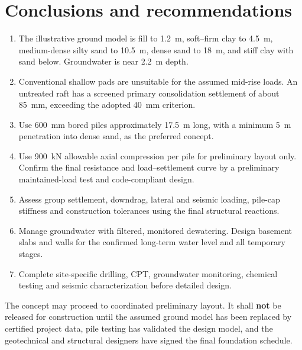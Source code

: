 \section{Conclusions and recommendations}
\begin{enumerate}
  \item The illustrative ground model is fill to \SI{1.2}{\metre}, soft--firm clay to
        \SI{4.5}{\metre}, medium-dense silty sand to \SI{10.5}{\metre}, dense sand to
        \SI{18}{\metre}, and stiff clay with sand below. Groundwater is near
        \SI{2.2}{\metre} depth.
  \item Conventional shallow pads are unsuitable for the assumed mid-rise loads. An untreated
        raft has a screened primary consolidation settlement of about \SI{85}{\milli\metre},
        exceeding the adopted \SI{40}{\milli\metre} criterion.
  \item Use \SI{600}{\milli\metre} bored piles approximately \SI{17.5}{\metre} long, with a
        minimum \SI{5}{\metre} penetration into dense sand, as the preferred concept.
  \item Use \SI{900}{\kilo\newton} allowable axial compression per pile for preliminary layout
        only. Confirm the final resistance and load--settlement curve by a preliminary
        maintained-load test and code-compliant design.
  \item Assess group settlement, downdrag, lateral and seismic loading, pile-cap stiffness and
        construction tolerances using the final structural reactions.
  \item Manage groundwater with filtered, monitored dewatering. Design basement slabs and walls
        for the confirmed long-term water level and all temporary stages.
  \item Complete site-specific drilling, CPT, groundwater monitoring, chemical testing and
        seismic characterization before detailed design.
\end{enumerate}

\begin{decisionbox}
The concept may proceed to coordinated preliminary layout. It shall \textbf{not} be released for
construction until the assumed ground model has been replaced by certified project data, pile
testing has validated the design model, and the geotechnical and structural designers have signed
the final foundation schedule.
\end{decisionbox}

